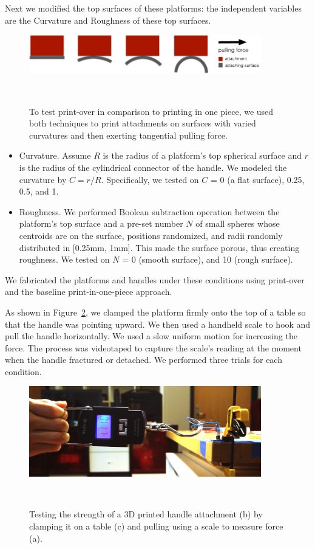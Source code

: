 Next we modified the top surfaces of these platforms: the independent variables are the Curvature and Roughness of these top surfaces.

\begin{figure}[h]
  \centering
  \includegraphics[width=0.9\textwidth]{figures/encore_eval_printover.pdf}
  \caption{To test print-over in comparison to printing in one piece, we used both techniques to print attachments on surfaces with varied curvatures and then exerting tangential pulling force.}~\label{fig:encore_eval_strap}
\end{figure}

\begin{itemize}
\item Curvature. Assume $R$ is the radius of a platform's top spherical surface and $r$ is the radius of the cylindrical connector of the handle. We modeled the curvature by $C = r/R$. Specifically, we tested on $C$ = 0 (a flat surface), 0.25, 0.5, and 1.

\item Roughness. We performed Boolean subtraction operation between the platform's top surface and a pre-set number $N$ of small spheres whose centroids are on the surface, positions randomized, and radii randomly distributed in [0.25mm, 1mm]. This made the surface porous, thus creating roughness. We tested on $N$ = 0 (smooth surface), and 10 (rough surface).
\end{itemize}

We fabricated the platforms and handles under these conditions using print-over and the baseline print-in-one-piece approach.

As shown in Figure~\ref{fig:encore_eval_scene}, we clamped the platform firmly onto the top of a table so that the handle was pointing upward. We then used a handheld scale to hook and pull the handle horizontally. We used a slow uniform motion for increasing the force. The process was videotaped to capture the scale's reading at the moment when the handle fractured or detached. We performed three trials for each condition.

\begin{figure}[h]
  \centering
  \includegraphics[width=0.9\textwidth]{figures/encore_evaluation_scene.pdf}
  \caption{Testing the strength of a 3D printed handle attachment (b) by clamping it on a table (c) and pulling using a scale to measure force (a).}~\label{fig:encore_eval_scene}
\end{figure}

